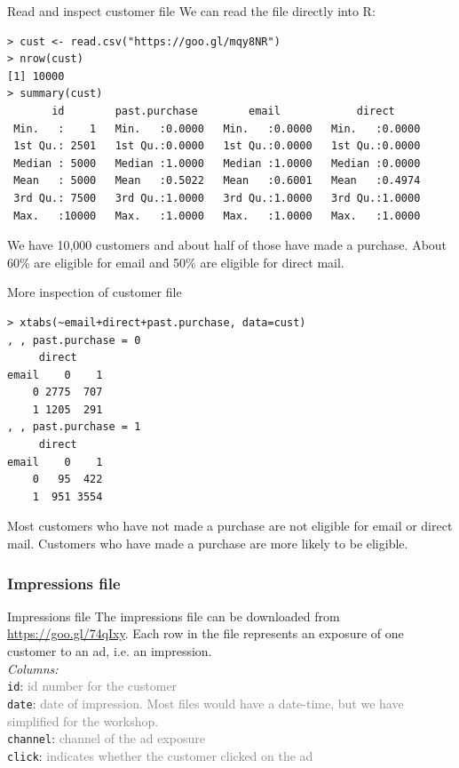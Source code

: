 \documentclass[10pt, aspectratio=169]{beamer}
\begin{document}
\begin{frame}[fragile]{Read and inspect \alert{customer file}}
We can read the file directly into R: 
\begin{lstlisting}
> cust <- read.csv("https://goo.gl/mqy8NR")
> nrow(cust)
[1] 10000
> summary(cust)
       id        past.purchase        email            direct      
 Min.   :    1   Min.   :0.0000   Min.   :0.0000   Min.   :0.0000  
 1st Qu.: 2501   1st Qu.:0.0000   1st Qu.:0.0000   1st Qu.:0.0000  
 Median : 5000   Median :1.0000   Median :1.0000   Median :0.0000  
 Mean   : 5000   Mean   :0.5022   Mean   :0.6001   Mean   :0.4974  
 3rd Qu.: 7500   3rd Qu.:1.0000   3rd Qu.:1.0000   3rd Qu.:1.0000  
 Max.   :10000   Max.   :1.0000   Max.   :1.0000   Max.   :1.0000  
\end{lstlisting}
\alert{We have 10,000 customers and about half of those have made a purchase. About 60\% are eligible for email and 50\% are eligible for direct mail.}
\end{frame}

\begin{frame}[fragile]{More inspection of \alert{customer file}}
\begin{lstlisting}
> xtabs(~email+direct+past.purchase, data=cust)
, , past.purchase = 0
     direct
email    0    1
    0 2775  707
    1 1205  291
, , past.purchase = 1
     direct
email    0    1
    0   95  422
    1  951 3554
\end{lstlisting}
\alert{Most customers who have not made a purchase are not eligible for email or direct mail. Customers who have made a purchase are more likely to be eligible.}
\end{frame}

\subsubsection{Impressions file}

\begin{frame}[fragile]{\alert{Impressions file}}
The impressions file can be downloaded from \href{https://goo.gl/74qIxy}{https://goo.gl/74qIxy}. Each row in the file represents an exposure of one customer to an ad, i.e. an impression.\\
\bigskip
\emph{Columns:} \\
\verb|id|: \textcolor{gray}{id number for the customer}\\
\verb|date|: \textcolor{gray}{date of impression. Most files would have a date-time, but we have simplified for the workshop.}  \\
\verb|channel|: \textcolor{gray}{channel of the ad exposure} \\
\verb|click|: \textcolor{gray}{indicates whether the customer clicked on the ad} \\
\end{frame}
\end{document}
